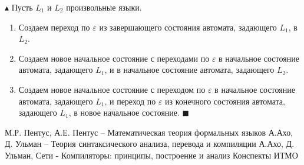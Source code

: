 \documentclass[11pt,a4paper]{report}
\theoremstyle{definition}
\theoremstyle{definition}
\theoremstyle{definition}
\begin{document}
$\blacktriangle$ Пусть $L_1$ и $L_2$ произвольные языки.
\begin{enumerate}
\item{Создаем переход по $\varepsilon$ из завершающего состояния автомата, задающего $L_1$, в $L_2$.}
\item{Создаем новое начальное состояние с переходами по $\varepsilon$ в начальное состояние автомата, задающего $L_1$, и в начальное состояние автомата, задающего $L_2$.}
\item{Создаем новое начальное состояние с переходом по $\varepsilon$ в начальное состояние автомата, задающего $L_1$, и переход по $\varepsilon$ из конечного состояния автомата, задающего $L_1$, в новое начальное состояние. $\blacksquare$}
\end{enumerate}
\begin{thebibliography}{0}
М.Р. Пентус, А.Е. Пентус -- Математическая теория формальных языков
А.Ахо, Д. Ульман -- Теория синтаксического анализа, перевода и компиляции
А.Ахо, Д. Ульман, Сети - Компиляторы: принципы, построение и анализ
Конспекты ИТМО
\end{thebibliography}
\end{document}
